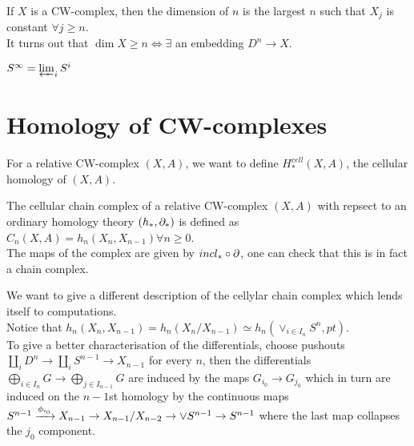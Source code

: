 \documentclass[../main.tex]{subfiles}
\begin{document}
If $X$ is a CW-complex, then the dimension of $n$ is the largest $n$ such that $X_j$ is constant $\forall j \geq n$.\\
It turns out that $\dim X \geq n \iff \exists$ an embedding $D^{n}\to X$.
\begin{exemple}
$S^{ \infty }= \varprojlim_i S^{i}$ 
\end{exemple}
\section{Homology of CW-complexes}
For a relative CW-complex $( X,A) $, we want to define $H_\ast^{cell}( X,A) $, the cellular homology of $( X,A) $.
\begin{defn}
	The cellular chain complex of a relative CW-complex $( X,A) $ with repsect to an ordinary homology theory $( h_\ast,\partial_\ast) $ is defined as $C_n( X,A) = h_n( X_n,X_{n-1} )\forall n \geq 0 $.\\
	The maps of the complex are given by $incl_\ast \circ \partial$, one can check that this is in fact a chain complex.
\end{defn}
We want to give a different description of the cellylar chain complex which lends itself to computations.\\
Notice that $h_n( X_n,X_{n-1} ) = h_n( X_n /X_{n-1} )\simeq h_n( \vee_{i\in I_n} S^{n}, pt)  $.\\
To give a better characterisation of the differentials, choose pushouts $\coprod_i D^{n} \rightarrow \coprod_i S^{n-1}\to X_{n-1} $ for every $n$, then the differentials $\bigoplus_{i \in I_n} G \to \bigoplus_{j \in I_{n-1} } G$ are induced by the maps $G_{i_0} \to G_{j_0} $ which in turn are induced on the $n-1$st  homology by the continuous maps $S^{n-1}\xrightarrow{\phi_{i_0} } X_{n-1} \to X_{n-1} /X_{n-2} \to \vee S^{n-1}\to S^{n-1} $ where the last map collapses the $j_0$ component.
\end{document}
